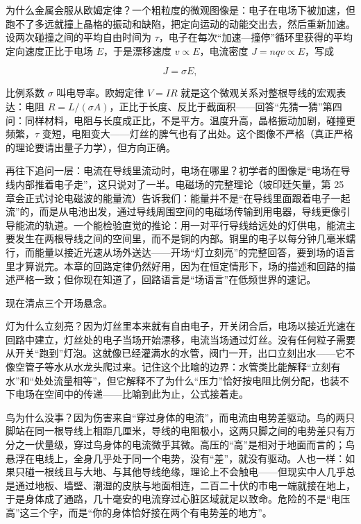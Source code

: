 \begin{mathbridge}
为什么金属会服从欧姆定律？一个粗粒度的微观图像是：电子在电场下被加速，但跑不了多远就撞上晶格的振动和缺陷，把定向运动的动能交出去，然后重新加速。设两次碰撞之间的平均自由时间为 \(\tau\)，电子在每次“加速—撞停”循环里获得的平均定向速度正比于电场 \(E\)，于是漂移速度 \(v\propto E\)，电流密度 \(J=nqv\propto E\)，写成

\[
J=\sigma E,
\]

比例系数 \(\sigma\) 叫电导率。欧姆定律 \(V=IR\) 就是这个微观关系对整根导线的宏观表达：电阻 \(R=L/(\sigma A)\)，正比于长度、反比于截面积——回答“先猜一猜”第四问：同样材料，电阻与长度成正比，不是平方。温度升高，晶格振动加剧，碰撞更频繁，\(\tau\) 变短，电阻变大——灯丝的脾气也有了出处。这个图像不严格（真正严格的理论要请出量子力学），但方向正确。
\end{mathbridge}

\begin{challenge}
再往下追问一层：电流在导线里流动时，电场在哪里？初学者的图像是“电场在导线内部推着电子走”，这只说对了一半。电磁场的完整理论（坡印廷矢量，第 25 章会正式讨论电磁波的能量流）告诉我们：能量并不是“在导线里面跟着电子一起流”的，而是从电池出发，通过导线周围空间的电磁场传输到用电器，导线更像引导能流的轨道。一个能检验直觉的推论：用一对平行导线给远处的灯供电，能流主要发生在两根导线之间的空间里，而不是铜的内部。铜里的电子以每分钟几毫米蠕行，而能量以接近光速从场外送达——开场“灯立刻亮”的完整回答，要到场的语言里才算说完。本章的回路定律仍然好用，因为在恒定情形下，场的描述和回路的描述严格一致；但你现在知道了，回路语言是“场语言”在低频世界的速记。
\end{challenge}


现在清点三个开场悬念。

灯为什么立刻亮？因为灯丝里本来就有自由电子，开关闭合后，电场以接近光速在回路中建立，灯丝处的电子当场开始漂移，电流当场通过灯丝。没有任何粒子需要从开关“跑到”灯泡。这就像已经灌满水的水管，阀门一开，出口立刻出水——它不像空管子等水从水龙头爬过来。记住这个比喻的边界：水管类比能解释“立刻有水”和“处处流量相等”，但它解释不了为什么“压力”恰好按电阻比例分配，也装不下电场在空间中的传递——比喻到此为止，公式接着走。

鸟为什么没事？因为伤害来自“穿过身体的电流”，而电流由电势差驱动。鸟的两只脚站在同一根导线上相距几厘米，导线的电阻极小，这两只脚之间的电势差只有万分之一伏量级，穿过鸟身体的电流微乎其微。高压的“高”是相对于地面而言的；鸟悬浮在电线上，全身几乎处于同一个电势，没有“差”，就没有驱动。人也一样：如果只碰一根线且与大地、与其他导线绝缘，理论上不会触电——但现实中人几乎总是通过地板、墙壁、潮湿的皮肤与地面相连，二百二十伏的市电一端就接在地上，于是身体成了通路，几十毫安的电流穿过心脏区域就足以致命。危险的不是“电压高”这三个字，而是“你的身体恰好接在两个有电势差的地方”。

